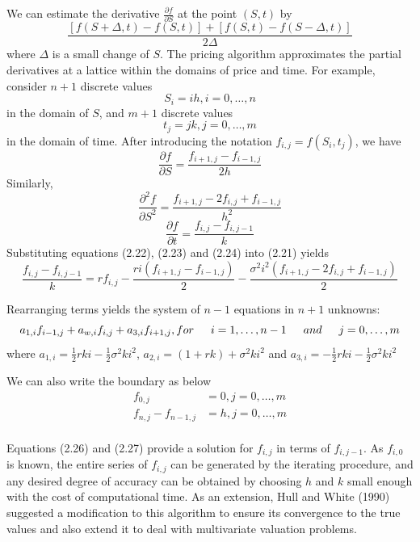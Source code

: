 \documentclass[11pt]{book}
\begin{document}
We can estimate the derivative $\frac{\partial f}{\partial S}$ at
the point $(S,t)$ by
$$\frac{[f(S+\Delta,t)-f(S,t)]+[f(S,t)-f(S-\Delta,t)]}{2\Delta}$$
where $\Delta$ is a small change of $S$. The pricing algorithm
approximates the partial derivatives at a lattice within the domains
of price and time. For example, consider $n+1$ discrete values
$$S_i=ih, i=0,\ldots,n$$
in the domain of $S$, and $m+1$ discrete values
$$t_j=jk, j=0,\ldots,m$$
in the domain of time. After introducing the notation
$f_{i,j}=f(S_i,t_j)$, we have
\begin{equation}
\frac{\partial f}{\partial S}=\frac{f_{i+1,j}-f_{i-1,j}}{2h}
\end{equation}
Similarly,
\begin{equation}
\frac{\partial^2 f}{\partial
S^2}=\frac{f_{i+1,j}-2f_{i,j}+f_{i-1,j}}{h^2}
\end{equation}
\begin{equation}
\frac{\partial f}{\partial t}=\frac{f_{i,j}-f_{i,j-1}}{k}
\end{equation}
Substituting equations (2.22), (2.23) and (2.24) into (2.21) yields
\begin{equation}
\frac{f_{i,j}-f_{i,j-1}}{k}=rf_{i,j}-\frac{ri(f_{i+1,j}-f_{i-1,j})}{2}-\frac{\sigma^2
i^2(f_{i+1,j}-2f_{i,j}+f_{i-1,j})}{2}
\end{equation}

Rearranging terms yields the system of $n-1$ equations in $n+1$
unknowns:
\begin{equation}
a_{1,i}f_{i-1,j}+a_{w,i}f_{i,j}+a_{3,i}f_{i+1,j}, for \indent
i=1,\ldots,n-1 \indent and \indent j=0,\ldots,m
\end{equation}
where $a_{1,i}=\frac{1}{2}rki-\frac{1}{2}\sigma^2ki^2$,
$a_{2,i}=(1+rk)+\sigma^2ki^2$ and
$a_{3,i}=-\frac{1}{2}rki-\frac{1}{2}\sigma^2ki^2$

We can also write the boundary as below
\begin{equation}
\begin{split}
f_{0,j}&=0, j=0,\ldots,m\\
f_{n,j}-f_{n-1,j}&=h, j=0,\ldots,m\\
\end{split}
\end{equation}

Equations (2.26) and (2.27) provide a solution for $f_{i,j}$ in
terms of $f_{i,j-1}$. As $f_{i,0}$ is known, the entire series of
$f_{i,j}$  can be generated by the iterating procedure, and any
desired degree of accuracy can be obtained by choosing $h$ and $k$
small enough with the cost of computational time. As an extension,
Hull and White (1990) suggested a modification to this algorithm to
ensure its convergence to the true values and also extend it to deal
with multivariate valuation problems.
\end{document}

